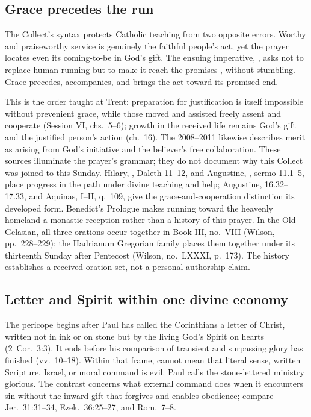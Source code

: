 \elementguard
\subsection*{Grace precedes the run }

The Collect's syntax protects Catholic teaching from two opposite errors.
Worthy and praiseworthy service is genuinely the faithful people's act, yet
the prayer locates even its coming-to-be in God's gift. The ensuing imperative,
, asks not to replace human running but to make it reach the
promises , without stumbling. Grace precedes, accompanies,
and brings the act toward its promised end.

This is the order taught at Trent: preparation for justification is itself
impossible without prevenient grace, while those moved and assisted freely
assent and cooperate (Session VI, chs.~5--6); growth in the received life
remains God's gift and the justified person's action (ch.~16). The
 2008--2011 likewise describes merit as arising from God's
initiative and the believer's free collaboration. These sources illuminate the
prayer's grammar; they do not document why this Collect was joined to this
Sunday. Hilary, , Daleth 11--12, and Augustine,
, sermo 11.1--5, place progress in the path
under divine teaching and help; Augustine,  16.32--17.33, and Aquinas,  I--II, q.~109, give the
grace-and-cooperation distinction its developed form. Benedict's Prologue
makes running toward the heavenly homeland a monastic reception rather than a
history of this prayer. In the Old Gelasian, all three orations occur together in
Book III, no.~VIII (Wilson, pp.~228--229); the Hadrianum Gregorian family
places them together under its thirteenth Sunday after Pentecost (Wilson,
no.~LXXXI, p.~173). The history establishes a received oration-set, not a
personal authorship claim.

\elementguard
\subsection*{Letter and Spirit within one divine economy }

The pericope begins after Paul has called the Corinthians a letter of Christ,
written not in ink or on stone but by the living God's Spirit on hearts
(2~Cor.~3:3). It ends before his comparison of transient and surpassing glory
has finished (vv.~10--18). Within that frame, 
cannot mean that literal sense, written Scripture, Israel, or moral command is
evil. Paul calls the stone-lettered ministry glorious. The contrast concerns
what external command does when it encounters sin without the inward gift that
forgives and enables obedience; compare Jer.~31:31--34, Ezek.~36:25--27, and
Rom.~7--8.

